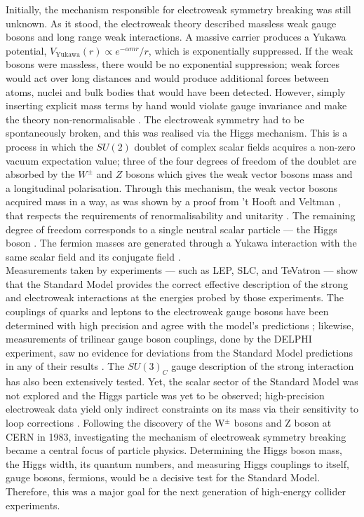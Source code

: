 \documentclass[a4paper,11pt]{article}
\begin{document}
Initially, the mechanism responsible for electroweak symmetry breaking was still unknown. As it stood, the electroweak theory described massless weak gauge bosons and long range weak interactions. A massive carrier produces a Yukawa potential, $V_{\text{Yukawa}}(r) \propto e^ {-\alpha m r}/r$, which is exponentially suppressed. If the weak bosons were massless, there would be no exponential suppression; weak forces would act over long distances and would produce additional forces between atoms, nuclei and bulk bodies that would have been detected. However, simply inserting explicit mass terms by hand would violate gauge invariance and make the theory non-renormalisable \cite{THOOFT1972189}. The electroweak symmetry had to be spontaneously broken, and this was realised via the Higgs mechanism. This is a process in which the $SU(2)$ doublet of complex scalar fields acquires a non-zero vacuum expectation value; three of the four degrees of freedom of the doublet are absorbed by the $W^\pm$ and $Z$ bosons which gives the weak vector bosons mass and a longitudinal polarisation\cite{Higgs:1964pj}. Through this mechanism, the weak vector bosons acquired mass in a way, as was shown by a proof from 't Hooft and Veltman \cite{tHooft:1972ikm},  that respects the requirements of renormalisability and unitarity \cite{tHooft:1971qjg}. The remaining degree of freedom corresponds to a single neutral scalar particle --- the Higgs boson \cite{Englert:1964et}. The fermion masses are generated through a Yukawa interaction with the same scalar field and its conjugate field \cite{Djouadi:2005gi}.\\

Measurements taken by experiments --- such as LEP, SLC, and TeVatron --- show that the Standard Model provides the correct effective description of the strong and electroweak interactions at the energies probed by those experiments. The couplings of quarks and leptons to the electroweak gauge bosons have been determined with high precision and agree with the model’s predictions \cite{Djouadi:2005gi}; likewise, measurements of trilinear gauge boson couplings, done by the DELPHI experiment, saw no evidence for deviations from the Standard Model  predictions in any of their results \cite{DELPHI:2001kqh}. The $SU(3)_C$ gauge description of the strong interaction has also been extensively tested. Yet, the scalar sector of the Standard Model was not explored and the Higgs particle was yet to be observed; high-precision electroweak  data yield only indirect constraints on its mass via their sensitivity to loop corrections \cite{Buescher:2005re}. Following the discovery of the W$^{\pm}$ bosons \cite{UA1:1983mne} and Z boson \cite{UA2:1983mlz} at CERN in 1983, investigating the mechanism of electroweak symmetry breaking became a central focus of particle physics. Determining the Higgs boson mass, the Higgs width, its quantum numbers, and  measuring  Higgs couplings to itself, gauge bosons, fermions, would be a decisive test for the Standard Model. Therefore, this was a major goal for the next generation of high-energy collider experiments.
	
\end{document}
